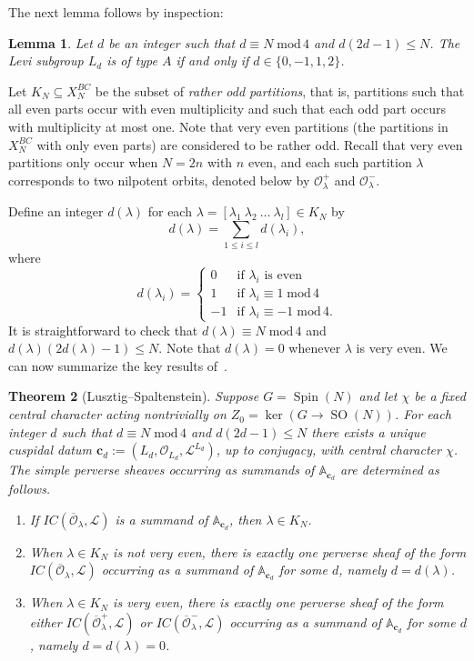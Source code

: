 \documentclass[reqno,11pt]{amsart}
\newtheorem{Thm}{Theorem}[section]
\newtheorem{Lem}[Thm]{Lemma}
\theoremstyle{remark}
\theoremstyle{remark}
\theoremstyle{definition}
\theoremstyle{definition}
\theoremstyle{definition}
\numberwithin{equation}{section}
\renewcommand{\ker}{\operatorname{ker }}
\newcommand{\SO}{\operatorname{SO}}
\newcommand{\Spin}{\operatorname{Spin}}
\newcommand{\cl}{\mathcal{L}}
\newcommand{\co}{\mathcal{O}}
\renewcommand{\mod}{\;\mathrm{mod}\,}
\begin{document}
The next lemma follows by inspection:

\begin{Lem}\label{lem.Spin.Levi} Let $d$ be an integer such that $d\equiv N\mod 4$ and $d(2d-1)\leq N$. The Levi subgroup $L_d$ is of type $A$ if and only if $d\in \{0,-1,1,2\}$. 
\end{Lem}


Let $K_N \subseteq X_N^{BC}$ be the subset of \emph{rather odd partitions}, that is, partitions such that all even parts occur with even multiplicity and such that each odd part occurs with multiplicity at most one. Note that very even partitions (the partitions in $X_N^{BC}$ with only even parts) are considered to be rather odd.  Recall that very even partitions only occur when $N=2n$ with $n$ even, and each such partition $\lambda$ corresponds to two nilpotent orbits, denoted below by $\co_\lambda^+$ and $\co_\lambda^-$. 


Define an integer $d(\lambda)$ for each $\lambda= [\lambda_1\ \lambda_2\ \dots\ \lambda_l] \in K_N$ by 
\[
d(\lambda) = \displaystyle \sum_{1\leq i\leq l} d(\lambda_i),
\] 
where 
\begin{equation*}
d(\lambda_i)=\begin{cases} 0 & \text{if } \lambda_i\text{ is even} \\ 1 & \text{if } \lambda_i\equiv 1\mod 4 \\ -1 & \text{if }\lambda_i\equiv  -1 \mod 4.\end{cases} 
\end{equation*}
It is straightforward to check that  $d(\lambda)\equiv N \mod 4$ and $d(\lambda)(2d(\lambda)-1)\leq N$. Note that $d(\lambda)=0$ whenever $\lambda$ is very even. We can now summarize the key results of~\cite{LuSpal85}.


\begin{Thm}[Lusztig--Spaltenstein] \label{thm.Lusztig-Spaltenstein} Suppose $G=\Spin(N)$ and let $\chi$ be a fixed central character acting nontrivially on $Z_0 = \ker(G\to \SO(N))$. For each integer $d$ such that $d\equiv N \mod 4$ and $d(2d-1)\leq N$ there exists a unique cuspidal datum $\mathbf{c}_d:=(L_d, \co_{L_d}, \cl^{L_d})$, up to conjugacy, with central character $\chi$.  The simple perverse sheaves occurring as summands of $\mathbb{A}_{\mathbf{c}_d}$ are determined as follows.
\begin{enumerate}
\item If $IC(\overline{\co}_\lambda, \cl)$ is a summand of $\mathbb{A}_{\mathbf{c}_d}$, then $\lambda\in K_N$. 
\item When $\lambda\in K_N$ is not very even, there is exactly one perverse sheaf of the form  $IC(\overline{\co}_\lambda, \cl)$ occurring as a summand of $\mathbb{A}_{\mathbf{c}_d}$ for some $d$, namely $d=d(\lambda)$.
\item When $\lambda\in K_N$ is very even, there is exactly one perverse sheaf of the form either  $IC(\overline{\co}^+_\lambda, \cl)$ or $IC(\overline{\co}^-_\lambda, \cl)$ occurring as a summand of $\mathbb{A}_{\mathbf{c}_d}$ for some $d$, namely $d=d(\lambda)=0$. 
\end{enumerate}
\end{Thm}
\end{document}
